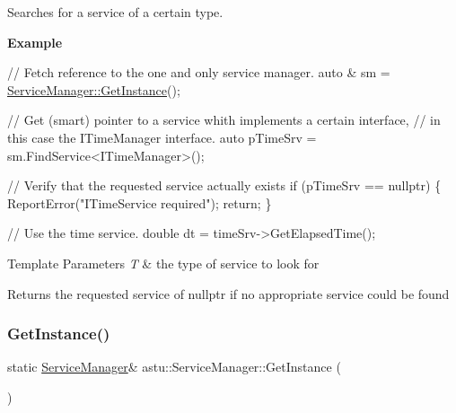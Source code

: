 Searches for a service of a certain type.

{\bfseries Example}


\begin{DoxyCode}
\textcolor{comment}{// Fetch reference to the one and only service manager.}
\textcolor{keyword}{auto} & sm = \hyperlink{classastu_1_1ServiceManager_a26941fe98ea3f2792deca62e4124bf15}{ServiceManager::GetInstance}();

\textcolor{comment}{// Get (smart) pointer to a service whith implements a certain interface,}
\textcolor{comment}{// in this case the ITimeManager interface.}
\textcolor{keyword}{auto} pTimeSrv = sm.FindService<ITimeManager>();

\textcolor{comment}{// Verify that the requested service actually exists}
\textcolor{keywordflow}{if} (pTimeSrv == \textcolor{keyword}{nullptr}) \{
  ReportError(\textcolor{stringliteral}{"ITimeService required"});
  \textcolor{keywordflow}{return};
\}

\textcolor{comment}{// Use the time service.}
\textcolor{keywordtype}{double} dt = timeSrv->GetElapsedTime();
\end{DoxyCode}



\begin{DoxyTemplParams}{Template Parameters}
{\em T} & the type of service to look for \\
\hline
\end{DoxyTemplParams}
\begin{DoxyReturn}{Returns}
the requested service of {\ttfamily nullptr} if no appropriate service could be found 
\end{DoxyReturn}
\mbox{\label{classastu_1_1ServiceManager_a26941fe98ea3f2792deca62e4124bf15}} 
\subsubsection{\texorpdfstring{Get\+Instance()}{GetInstance()}}
{\footnotesize\ttfamily static \hyperlink{classastu_1_1ServiceManager}{Service\+Manager}\& astu\+::\+Service\+Manager\+::\+Get\+Instance (\begin{DoxyParamCaption}{ }\end{DoxyParamCaption})\hspace{0.3cm}{\ttfamily [static]}}

